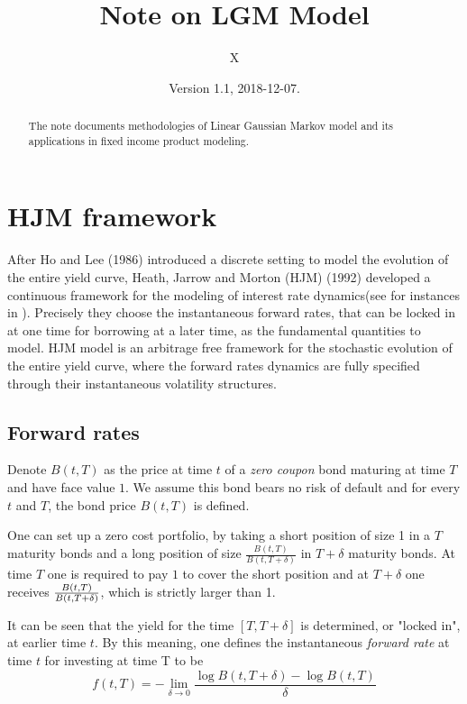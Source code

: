 \documentclass[10pt]{article}
\theoremstyle{plain}
\numberwithin{equation}{section}
\numberwithin{table}{section}
\begin{document}
\title{Note on LGM Model}
\author{X}
\date{Version 1.1, 2018-12-07.}

\maketitle

\begin{abstract}
The note documents methodologies of Linear Gaussian Markov model and its applications in 
fixed income product modeling.
\end{abstract}

\tableofcontents

\newpage

\section{HJM framework}
After Ho and Lee (1986) introduced a discrete setting to model the evolution
of the entire yield curve, Heath, Jarrow and Morton (HJM) (1992) developed a
continuous framework for the modeling of interest rate dynamics(see for
instances in \cite{Mercurio}). Precisely they choose the instantaneous
forward rates, that can be locked in at one time for borrowing at a later
time, as the fundamental quantities to model. HJM model is an arbitrage free
framework for the stochastic evolution of the entire yield curve, where the
forward rates dynamics are fully specified through their instantaneous
volatility structures.

\subsection{Forward rates}

Denote $B(t,T)$ as the price at time $t$ of a \emph{zero coupon} bond
maturing at time $T$ and have face value $1$. We assume this bond bears no
risk of default and for every $t$ and $T$, the bond price $B(t,T)$ is
defined.

One can set up a zero cost portfolio, by taking a short position of size 1
in a $T$ maturity bonds and a long position of size $\frac{B(t,T)}{B(t,T +
\delta)}$ in $T + \delta$ maturity bonds. At time $T$ one is required to pay
$1$ to cover the short position and at $T + \delta$ one receives $\frac{%
B(t,T)}{B(t,T + \delta)}$, which is strictly larger than 1.

It can be seen that the yield for the time $[T, T + \delta]$ is determined,
or "locked in", at earlier time $t$. By this meaning, one defines the
instantaneous \emph{forward rate} at time $t$ for investing at time T to be
\[
    f(t,T)=-\underset{\delta \rightarrow 0}{\lim }\frac{\log B(t,T+\delta )-\log
B(t,T)}{\delta }    
\]
\end{document}
